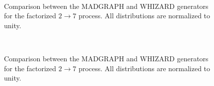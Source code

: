 \begin{figure}[ht]
\centering
  \\

  \caption{Comparison between the MADGRAPH and WHIZARD generators for the factorized $2 \to 7$ process. All distributions are normalized to unity.}
  \label{fig_simu_comp_2to7_2}
\end{figure}
 \begin{figure}
 \centering
   \\
   \caption{Comparison between the MADGRAPH and WHIZARD generators for the factorized $2 \to 7$ process. All distributions are normalized to unity.}
   \label{fig_simu_comp_2to7_3}
 \end{figure}